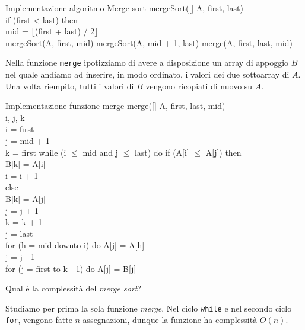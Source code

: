 \begin{code}{Implementazione algoritmo Merge sort}
\noindent\rmbreak\ind mergeSort([] A,  first,  last)\\
    if (first < last) then\\
        \indf{} mid = $\lfloor$(first + last) / 2$\rfloor$\\
        mergeSort(A, first, mid)\hfill{}
        mergeSort(A, mid + 1, last)\hfill{}
        merge(A, first, last, mid)\hfill{}
\end{code}\noindent
Nella funzione \texttt{merge} ipotizziamo di avere a disposizione un array di
appoggio $B$ nel quale andiamo ad inserire, in modo ordinato, i valori dei due
sottoarray di $A$. Una volta riempito, tutti i valori di $B$ vengono ricopiati
di nuovo su $A$.
\begin{code}{Implementazione funzione merge}
\noindent\rmbreak\ind merge([] A,  first,  last,  mid)\\
     i, j, k\\
    i = first\\
    j = mid + 1\\
    k = first\hfill{}
    while (i $\leq$ mid and j $\leq$ last) do\hfill{}
        \indf if (A[i] $\leq$ A[j]) then\\
            \indff B[k] = A[i]\\
            i = i + 1\\
        \indf else\\
            \indff B[k] = A[j]\\
            j = j + 1\\
        \indf k = k + 1\\
    \ind j = last\\
    for (h = mid downto i) do\hfill{}
        \indf A[j] = A[h]\\
        \indf j = j - 1\\
    \ind for (j = first to k - 1) do\hfill{}
        \indf A[j] = B[j]
\end{code}\noindent
Qual è la complessità del \emph{merge sort}?

\bigskip\noindent
Studiamo per prima la sola funzione \emph{merge}.
Nel ciclo \texttt{while} e nel secondo ciclo \texttt{for}, vengono fatte $n$
assegnazioni, dunque la funzione ha complessità $O(n)$.

